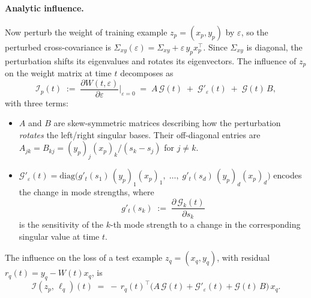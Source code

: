 \documentclass[11pt]{article}
\begin{document}
\begin{exercise}
\paragraph{Analytic influence.} Now perturb the weight of training example $z_p = (x_p,y_p)$ by $\varepsilon$, so the perturbed cross-covariance is $\Sigma_{xy}(\varepsilon) = \Sigma_{xy} + \varepsilon\,y_p x_p^\top$. Since $\Sigma_{xy}$ is diagonal, the perturbation shifts its eigenvalues and rotates its eigenvectors. The influence of $z_p$ on the weight matrix at time $t$ decomposes as
\begin{equation}\label{eq:dln-influence-formula}
  \mathcal{I}_p(t) \;:=\; \frac{\partial W(t,\varepsilon)}{\partial\varepsilon}\bigg\rvert_{\varepsilon=0} \;=\; A\,\mathcal{G}(t) \;+\; \mathcal{G}'_\varepsilon(t) \;+\; \mathcal{G}(t)\,B,
\end{equation}
with three terms:
\begin{itemize}
  \item $A$ and $B$ are skew-symmetric matrices describing how the perturbation \emph{rotates} the left/right singular bases. Their off-diagonal entries are $A_{jk} = B_{kj} = (y_p)_j(x_p)_k/(s_k - s_j)$ for $j \neq k$.
  \item $\mathcal{G}'_\varepsilon(t) = \mathrm{diag}\bigl(g'_t(s_1)\,(y_p)_1(x_p)_1,\;\dots,\;g'_t(s_d)\,(y_p)_d(x_p)_d\bigr)$ encodes the change in mode strengths, where
  \begin{equation}\label{eq:dln-mode-sensitivity}
    g'_t(s_k) \;:=\; \frac{\partial\,\mathcal{G}_k(t)}{\partial s_k}
  \end{equation}
  is the sensitivity of the $k$-th mode strength to a change in the corresponding singular value at time $t$.
\end{itemize}

The influence on the loss of a test example $z_q = (x_q, y_q)$, with residual $r_q(t) = y_q - W(t)x_q$, is
\begin{equation}\label{eq:dln-influence-loss}
  \mathcal{I}(z_p,\,\ell_q)(t) \;=\; -\,r_q(t)^\top\bigl(A\,\mathcal{G}(t) + \mathcal{G}'_\varepsilon(t) + \mathcal{G}(t)\,B\bigr)\,x_q.
\end{equation}


\end{exercise}
\end{document}
